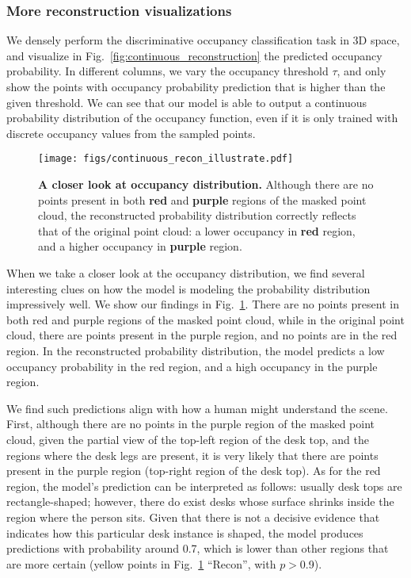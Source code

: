 \documentclass[runningheads]{llncs}
\begin{document}
\subsubsection{More reconstruction visualizations}
We densely perform the discriminative occupancy classification task in 3D space, and visualize in Fig.~\ref{fig:continuous_reconstruction} the predicted occupancy probability.  In different columns, we vary the occupancy threshold $\tau$, and only show the points with occupancy probability prediction that is higher than the given threshold. We can see that our model is able to output a continuous probability distribution of the occupancy function, even if it is only trained with discrete occupancy values from the sampled points.


\begin{figure}[t!]
    \centering
    \texttt{[image: figs/continuous\_recon\_illustrate.pdf]}
    \caption{\textbf{A closer look at occupancy distribution.}  Although there are no points present in both {\color{myred} \bf red} and {\color{mypurple} \bf purple} regions of the masked point cloud, the reconstructed probability distribution correctly reflects that of the original point cloud: a lower occupancy in {\color{myred} \bf red} region, and a higher occupancy in {\color{mypurple} \bf purple} region.
    }
    \label{fig:reconstruction_illustrate}
\end{figure}

When we take a closer look at the occupancy distribution, we find several interesting clues on how the model is modeling the probability distribution impressively well. We show our findings in Fig.~\ref{fig:reconstruction_illustrate}.
There are no points present in both {\color{myred} red} and {\color{mypurple} purple} regions of the masked point cloud, while in the original point cloud, there are points present in the {\color{mypurple} purple} region, and no points are in the {\color{myred} red} region.
In the reconstructed probability distribution, the model predicts a low occupancy probability in the {\color{myred} red} region, and a high occupancy in the {\color{mypurple} purple} region.

We find such predictions align with how a human might understand the scene.
First, although there are no points in the purple region of the masked point cloud, given the partial view of the top-left region of the desk top, and the regions where the desk legs are present, it is very likely that there are points present in the purple region (top-right region of the desk top).
As for the red region, the model's prediction can be interpreted as follows: usually  desk tops are rectangle-shaped; however, there do exist desks whose surface shrinks inside the region where the person sits.  Given that there is not a decisive evidence that indicates how this particular desk instance is shaped, the model produces predictions with probability around 0.7, which is lower than other regions that are more certain (yellow points in Fig.~\ref{fig:reconstruction_illustrate} ``Recon'', with $p$$>$0.9).
\end{document}
